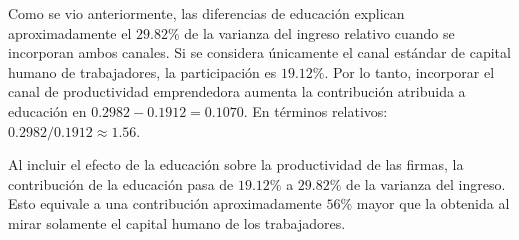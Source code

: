Como se vio anteriormente, las diferencias de educación explican aproximadamente el $29.82\%$ de la varianza del ingreso relativo cuando se incorporan ambos canales. Si se considera únicamente el canal estándar de capital humano de trabajadores, la participación es $19.12\%$. Por lo tanto, incorporar el canal de productividad emprendedora aumenta la contribución atribuida a educación en $0.2982 - 0.1912 = 0.1070$. En términos relativos: $0.2982/0.1912 \approx 1.56$.

Al incluir el efecto de la educación sobre la productividad de las firmas, la contribución de la educación pasa de $19.12\%$ a $29.82\%$ de la varianza del ingreso. Esto equivale a una contribución aproximadamente $56\%$ mayor que la obtenida al mirar solamente el capital humano de los trabajadores.